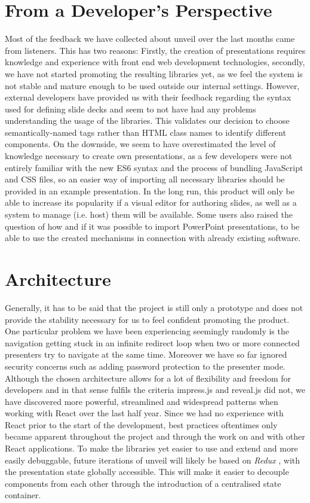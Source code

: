 \section{From a Developer's Perspective}
\label{sec:discussion-dev}

Most of the feedback we have collected about unveil over the last months came from listeners. This has two reasons: Firstly, the creation of presentations requires knowledge and experience with front end web development technologies, secondly, we have not started promoting the resulting libraries yet, as we feel the system is not stable and mature enough to be used outside our internal settings. However, external developers have provided us with their feedback regarding the syntax used for defining slide decks and seem to not have had any problems understanding the usage of the libraries. This validates our decision to choose semantically-named tags rather than HTML class names to identify different components. On the downside, we seem to have overestimated the level of knowledge necessary to create own presentations, as a few developers were not entirely familiar with the new ES6 syntax and the process of bundling JavaScript and CSS files, so an easier way of importing all necessary libraries should be provided in an example presentation.
In the long run, this product will only be able to increase its popularity if a visual editor for authoring slides, as well as a system to manage (i.e. host) them will be available. Some users also raised the question of how and if it was possible to import PowerPoint presentations, to be able to use the created mechanisms in connection with already existing software.

\section{Architecture}
\label{sec:discussion-architecture}

Generally, it has to be said that the project is still only a prototype and does not provide the stability necessary for us to feel confident promoting the product. One particular problem we have been experiencing seemingly randomly is the navigation getting stuck in an infinite redirect loop when two or more connected presenters try to navigate at the same time. Moreover we have so far ignored security concerns such as adding password protection to the presenter mode.
Although the chosen architecture allows for a lot of flexibility and freedom for developers and in that sense fulfils the criteria impress.js and reveal.js did not, we have discovered more powerful, streamlined and widespread patterns when working with React over the last half year. Since we had no experience with React prior to the start of the development, best practices oftentimes only became apparent throughout the project and through the work on and with other React applications. To make the libraries yet easier to use and extend and more easily debuggable, future iterations of unveil will likely be based on \emph{Redux} \cite{redux}, with the presentation state globally accessible. This will make it easier to decouple components from each other through the introduction of a centralised state container.